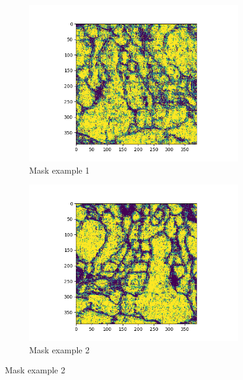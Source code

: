  \begin{figure}[H]
     \centering
     \begin{subfigure}[b]{0.3\textwidth}
         \centering
         \includegraphics[width=1.4\textwidth]{../openreview/figs/output_43.png}
         \caption{Mask example 1}
     \end{subfigure}
     \hfill
     \begin{subfigure}[b]{0.3\textwidth}
         \centering
         \includegraphics[width=1.4\textwidth]{../openreview/figs/output_27.png}
         \caption{Mask example 2}
     \end{subfigure}
     \hfill
\end{figure}